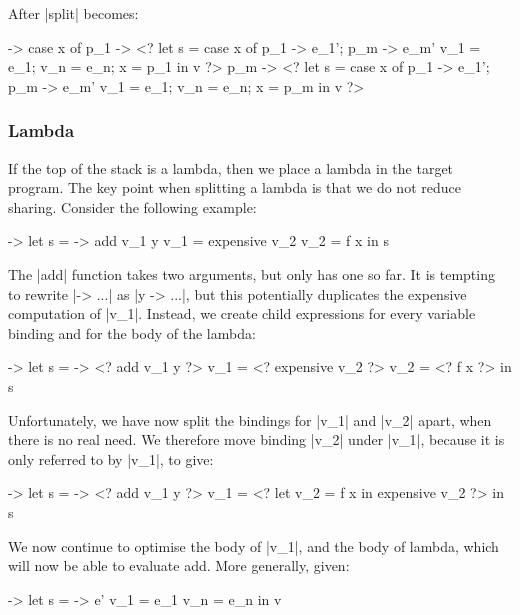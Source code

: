 \documentclass[draft]{sigplanconf}
\begin{document}
\noindent After |split| becomes:

\begin{code}
\free -> case x of
    p_1  -> <? let  s    = case x of p_1 -> e_1'; p_m -> e_m'
                    v_1  = e_1; v_n = e_n; x = p_1 in v ?>
    p_m  -> <? let  s    = case x of p_1 -> e_1'; p_m -> e_m'
                    v_1  = e_1; v_n = e_n; x = p_m in v ?>
\end{code}

\subsubsection{Lambda}
\label{sec:eval_split_lambda}

If the top of the stack is a lambda, then we place a lambda in the target program. The key point when splitting a lambda is that we do not reduce sharing. Consider the following example:

\begin{code}
\x ->  let  s    = \y -> add v_1 y
            v_1  = expensive v_2
            v_2  = f x
       in   s
\end{code}

The |add| function takes two arguments, but only has one so far. It is tempting to rewrite |\x -> ...| as |\x y -> ...|, but this potentially duplicates the expensive computation of |v_1|. Instead, we create child expressions for every variable binding and for the body of the lambda:

\begin{code}
\x ->  let  s    = \y -> <? add v_1 y ?>
            v_1  = <? expensive v_2 ?>
            v_2  = <? f x ?>
       in   s
\end{code}

Unfortunately, we have now split the bindings for |v_1| and |v_2| apart, when there is no real need. We therefore move binding |v_2| under |v_1|, because it is only referred to by |v_1|, to give:

\begin{code}
\x ->  let  s    = \y -> <? add v_1 y ?>
            v_1  = <? let v_2 = f x in expensive v_2 ?>
       in   s
\end{code}

We now continue to optimise the body of |v_1|, and the body of lambda, which will now be able to evaluate add. More generally, given:

\begin{code}
\free ->  let  s    = \x -> e'
               v_1  = e_1
               v_n  = e_n
          in   v
\end{code}
\end{document}
